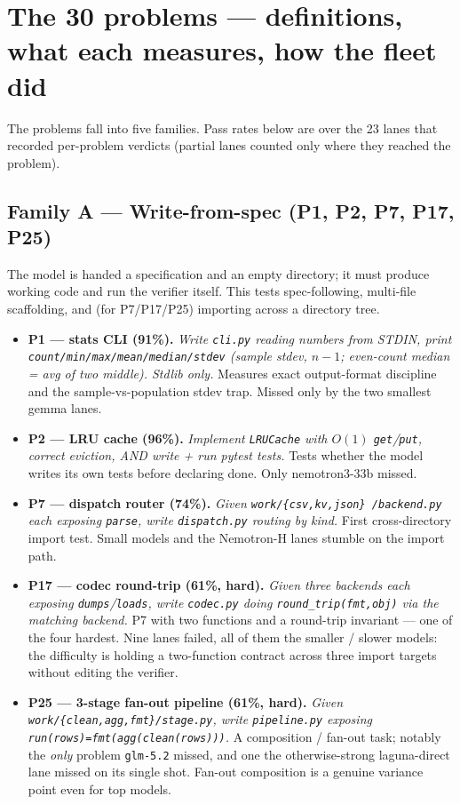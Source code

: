 \documentclass[11pt]{article}
\begin{document}
\section{The 30 problems --- definitions, what each measures, how the fleet did}

The problems fall into five families. Pass rates below are over the 23 lanes that
recorded per-problem verdicts (partial lanes counted only where they reached the
problem).

\subsection{Family A --- Write-from-spec (P1, P2, P7, P17, P25)}
The model is handed a specification and an empty directory; it must produce working
code and run the verifier itself. This tests spec-following, multi-file scaffolding,
and (for P7/P17/P25) importing across a directory tree.

\begin{itemize}
\item \textbf{P1 --- stats CLI (91\%).} \emph{Write \texttt{cli.py} reading numbers
  from STDIN, print \texttt{count/min/max/mean/median/stdev} (sample stdev, $n{-}1$;
  even-count median = avg of two middle). Stdlib only.} Measures exact output-format
  discipline and the sample-vs-population stdev trap. Missed only by the two smallest
  gemma lanes.
\item \textbf{P2 --- LRU cache (96\%).} \emph{Implement \texttt{LRUCache} with $O(1)$
  \texttt{get}/\texttt{put}, correct eviction, AND write + run pytest tests.} Tests
  whether the model writes its own tests before declaring done. Only nemotron3-33b
  missed.
\item \textbf{P7 --- dispatch router (74\%).} \emph{Given \texttt{work/\{csv,kv,json\}
  /backend.py} each exposing \texttt{parse}, write \texttt{dispatch.py} routing by
  kind.} First cross-directory import test. Small models and the Nemotron-H lanes
  stumble on the import path.
\item \textbf{P17 --- codec round-trip (61\%, hard).} \emph{Given three backends each
  exposing \texttt{dumps}/\texttt{loads}, write \texttt{codec.py} doing
  \texttt{round\_trip(fmt,obj)} via the matching backend.} P7 with two functions and a
  round-trip invariant --- one of the four hardest. Nine lanes failed, all of them
  the smaller / slower models: the difficulty is holding a two-function contract
  across three import targets without editing the verifier.
\item \textbf{P25 --- 3-stage fan-out pipeline (61\%, hard).} \emph{Given
  \texttt{work/\{clean,agg,fmt\}/stage.py}, write \texttt{pipeline.py} exposing
  \texttt{run(rows)=fmt(agg(clean(rows)))}.} A composition / fan-out task; notably the
  \emph{only} problem \texttt{glm-5.2} missed, and one the otherwise-strong
  laguna-direct lane missed on its single shot. Fan-out composition is a genuine
  variance point even for top models.
\end{itemize}
\end{document}
